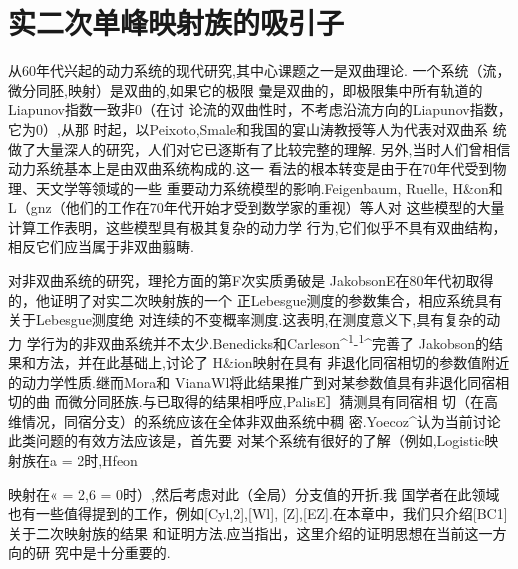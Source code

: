 \chapter{实二次单峰映射族的吸引子}
\label{part06}
从60年代兴起的动力系统的现代研究,其中心课题之一是双曲理论.
一个系统（流，微分同胚,映射）是双曲的,如果它的极限
彙是双曲的，即极限集中所有轨道的Liapunov指数一致非0（在讨
论流的双曲性时，不考虑沿流方向的Liapunov指数，它为0）,从那
时起，以Peixoto,Smale和我国的宴山涛教授等人为代表对双曲系
统做了大量深人的研究，人们对它已逐斯有了比较完整的理解.
另外,当时人们曾相信动力系统基本上是由双曲系统构成的.这一
看法的根本转变是由于在70年代受到物理、天文学等领域的一些
重要动力系统模型的影响.Feigenbaum, Ruelle, H\&on和
L（gnz（他们的工作在70年代开始才受到数学家的重视）等人对
这些模型的大量计算工作表明，这些模型具有极其复杂的动力学
行为,它们似乎不具有双曲结构，相反它们应当属于非双曲翦畴.

对非双曲系统的研究，理抡方面的第F次实质勇破是
JakobsonE在80年代初取得的，他证明了对实二次映射族的一个
正Lebesgue测度的参数集合，相应系统具有关于Lebesgue测度绝
对连续的不变概率测度.这表明,在测度意义下,具有复杂的动力
学行为的非双曲系统并不太少.Benedicks和Carleson\^{}\textsuperscript{1}-\textsuperscript{1}\^{}完善了
Jakobson的结果和方法，并在此基础上,讨论了 H\&ion映射在具有
非退化同宿相切的参数值附近的动力学性质.继而Mora和
VianaWl将此结果推广到对某参数值具有非退化同宿相切的曲
而微分同胚族.与已取得的结果相呼应,PalisE］猜测具有同宿相
切（在高维情况，同宿分支）的系统应该在全体非双曲系统中稠
密.Yoecoz\^{}认为当前讨论此类问题的有效方法应该是，首先要
对某个系统有很好的了解（例如,Logistic映射族在a = 2时,Hfeon

映射在« = 2,6 = 0时）,然后考虑对此（全局）分支值的开折.我
国学者在此领域也有一些值得提到的工作，例如{[}Cyl,2{]},{[}Wl{]},
{[}Z{]},{[}EZ{]}.在本章中，我们只介绍{[}BC1{]}关于二次映射族的结果
和证明方法.应当指出，这里介绍的证明思想在当前这一方向的研
究中是十分重要的.